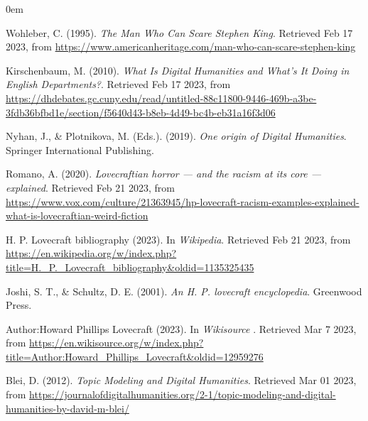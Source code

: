 \newpage

\begin{thebibliography}{9}
\itemsep0em

Wohleber, C. (1995). \emph{The Man Who Can Scare Stephen King}. Retrieved Feb 17 2023, from \href{https://www.americanheritage.com/man-who-can-scare-stephen-king}{https://www.americanheritage.com/man-who-can-scare-stephen-king}

Kirschenbaum, M. (2010). \emph{What Is Digital Humanities and What's It Doing in English Departments?}. Retrieved Feb 17 2023, from \href{https://dhdebates.gc.cuny.edu/read/untitled-88c11800-9446-469b-a3be-3fdb36bfbd1e/section/f5640d43-b8eb-4d49-bc4b-eb31a16f3d06}{https://dhdebates.gc.cuny.edu/read/untitled-88c11800-9446-469b-a3be-3fdb36bfbd1e/section/f5640d43-b8eb-4d49-bc4b-eb31a16f3d06}

Nyhan, J., \& Plotnikova, M. (Eds.). (2019). \emph{One origin of Digital Humanities}. Springer International Publishing.

Romano, A. (2020). \emph{Lovecraftian horror — and the racism at its core — explained}. Retrieved Feb 21 2023, from \href{https://www.vox.com/culture/21363945/hp-lovecraft-racism-examples-explained-what-is-lovecraftian-weird-fiction}{https://www.vox.com/culture/21363945/hp-lovecraft-racism-examples-explained-what-is-lovecraftian-weird-fiction}

H. P. Lovecraft bibliography (2023). In \emph{Wikipedia}. Retrieved Feb 21 2023, from \href{https://en.wikipedia.org/w/index.php?title=H._P._Lovecraft_bibliography&oldid=1135325435}{https://en.wikipedia.org/w/index.php?title=H.\_P.\_Lovecraft\_bibliography\&oldid=1135325435}

Joshi, S. T., \& Schultz, D. E. (2001). \emph{An H. P. lovecraft encyclopedia}. Greenwood Press. 

Author:Howard Phillips Lovecraft (2023). In \emph{Wikisource} . Retrieved Mar 7 2023, from \href{https://en.wikisource.org/w/index.php?title=Author:Howard_Phillips_Lovecraft&oldid=12959276}{https://en.wikisource.org/w/index.php?title=Author:Howard\_Phillips\_Lovecraft\&oldid=12959276}

Blei, D. (2012). \emph{Topic Modeling and Digital Humanities}. Retrieved Mar 01 2023, from \href{https://journalofdigitalhumanities.org/2-1/topic-modeling-and-digital-humanities-by-david-m-blei/}{https://journalofdigitalhumanities.org/2-1/topic-modeling-and-digital-humanities-by-david-m-blei/}


\end{thebibliography}
